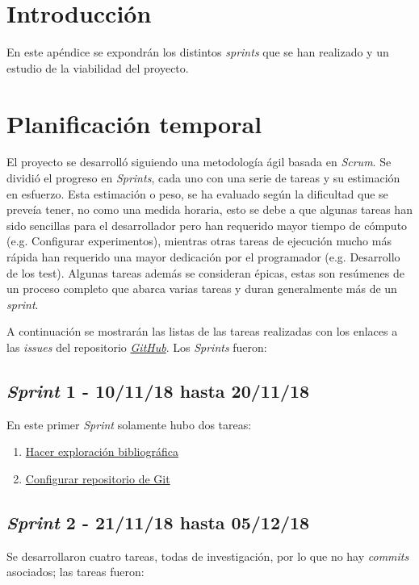 
\section{Introducción}

En este apéndice se expondrán los distintos \textit{sprints} que se han realizado y un estudio de la viabilidad del proyecto.

\section{Planificación temporal}

El proyecto se desarrolló siguiendo una metodología ágil basada en \textit{Scrum}. Se dividió el progreso en \textit{Sprints}, cada uno con una serie de tareas y su estimación en esfuerzo. Esta estimación o peso, se ha evaluado según la dificultad que se preveía tener, no como una medida horaria, esto se debe a que algunas tareas han sido sencillas para el desarrollador pero han requerido mayor tiempo de cómputo (e.g. Configurar experimentos), mientras otras tareas de ejecución mucho más rápida han requerido una mayor dedicación por el programador (e.g. Desarrollo de los test). Algunas tareas además se consideran épicas, estas son resúmenes de un proceso completo que abarca varias tareas y duran generalmente más de un \textit{sprint}. 

A continuación se mostrarán las listas de las tareas realizadas con los enlaces a las \textit{issues} del repositorio \textit{\href{https://github.com/jlgarridol/TFG-SmartBeds}{GitHub}}. Los \textit{Sprints} fueron:
\subsection{\textit{Sprint} 1 - 10/11/18 hasta 20/11/18}
En este primer \textit{Sprint} solamente hubo dos tareas:
\begin{enumerate}
	\item \href{https://github.com/joselucross/TFG-SmartBeds/issues/1}{Hacer exploración bibliográfica}
	\item \href{https://github.com/joselucross/TFG-SmartBeds/issues/2}{Configurar repositorio de Git}
\end{enumerate}
\subsection{\textit{Sprint} 2 - 21/11/18 hasta 05/12/18}
Se desarrollaron cuatro tareas, todas de investigación, por lo que no hay \textit{commits} asociados; las tareas fueron:

